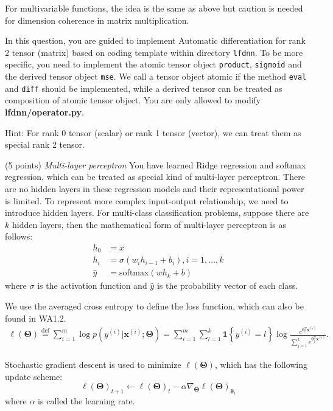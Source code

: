 \documentclass[a4paper, 12pt]{exam}
\newcommand{\bTheta}{\bm{\Theta}}
\newcommand*{\defeq}{\stackrel{\text{def}}{=}}
\begin{document}
\begin{questions}
		For multivariable functions, the idea is the same as above but caution is needed for dimension coherence in matrix multiplication.
		
		In this question, you are guided to implement Automatic differentiation for rank 2 tensor (matrix) based on coding template within directory \texttt{lfdnn}. To be more specific, you need to implement
		the atomic tensor object \texttt{product}, \texttt{sigmoid} and the derived tensor object \texttt{mse}. We call a tensor object
		atomic if the method \texttt{eval} and \texttt{diff} should be implemented, while a derived tensor can be treated as composition of
		atomic tensor object. You are only allowed to modify \textbf{lfdnn/operator.py}.
		
		Hint: For rank 0 tensor (scalar) or rank 1 tensor (vector), we can treat
		them as special rank 2 tensor.
		
		\question (5 points) \emph{Multi-layer perceptron} You have learned Ridge regression and softmax regression, which can be treated
		as special kind of multi-layer perceptron. There are no hidden layers in these regression models and their representational power is limited.
		To represent more complex input-output relationship, we need to introduce hidden layers. For multi-class classification problems, suppose there are $k$ hidden layers,
		then the mathematical form of multi-layer perceptron is as follows:
		\begin{align*}
		h_0 &= x \\
		h_i &= \sigma(w_i h_{i-1} + b_i), i = 1, \dots, k \\
		\hat{y} &= \textrm{softmax}(w h_k + b)
		\end{align*}
				where $\sigma$ is the activation function and $\hat{y}$ is the probability vector of each class.
				
		We use the averaged cross entropy to define the loss function, which can also be found in WA1.2.
		\begin{align*}
		\ell(\bTheta)
		\defeq \sum_{i=1}^{m} \log p(y^{(i)}|\bm{x}^{(i)};\bTheta) = \sum_{i=1}^{m}\sum_{l=1}^{k} \bm{1}\left\{ y^{(i)} = l\right\} \log \frac{e^{\bm{\theta}_l^{\mathrm{T}}\bm{x}^{(i)}}}{\sum_{j=1}^k e^{\bm{\theta}_j^{\mathrm{T}}\bm{x}^{(i)}}}.
		\end{align*}
		

		Stochastic gradient descent is used to minimize $\ell(\bTheta)$, which has the following update scheme:
		\begin{equation*}
		\ell(\bTheta)_{t+1} \leftarrow \ell(\bTheta)_t - \alpha \nabla_{\bm{\Theta}} \ell(\bTheta)_{\bm{\theta}_t}
		\end{equation*}
		where $\alpha$ is called the learning rate.


\end{questions}
\end{document}
